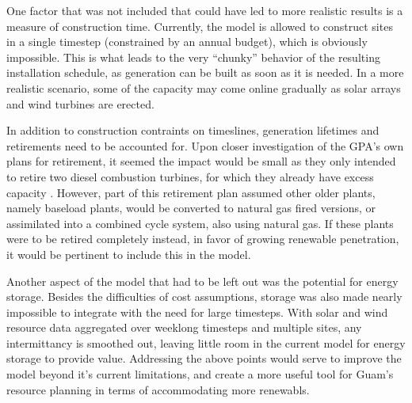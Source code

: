 \documentclass[12pt,letterpaper,fleqn]{article}
\begin{document}
One factor that was not included that could have led to more realistic
results is a measure of construction time. Currently, the model is
allowed to construct sites in a single timestep (constrained by an
annual budget), which is obviously impossible. This is what leads to
the very ``chunky'' behavior of the resulting installation schedule,
as generation can be built as soon as it is needed. In a more
realistic scenario, some of the capacity may come online gradually as
solar arrays and wind turbines are erected.

In addition to construction contraints on timeslines, generation
lifetimes and retirements need to be accounted for. 
Upon closer investigation of the GPA's own plans for
retirement, it seemed the impact would be small as they only intended
to retire two diesel combustion turbines, for which they already have
excess capacity \cite{cruz13}. However, part of this retirement plan
assumed other older plants, namely baseload plants, would be converted
to natural gas fired versions, or assimilated into a combined cycle
system, also using natural gas.  If these plants were to be retired
completely instead, in favor of growing renewable penetration, it
would be pertinent to include this in the model.

Another aspect of the model that had to be left out was the potential
for energy storage. Besides the difficulties of cost assumptions,
storage was also made nearly impossible to integrate with the need for
large timesteps. With solar and wind resource data aggregated over
weeklong timesteps and multiple sites, any intermittancy is smoothed
out, leaving little room in the current model for energy storage to
provide value. Addressing the above points would serve to improve the 
model beyond it's current limitations, and create a more useful tool for 
Guam's resource planning in terms of accommodating more renewabls.
\end{document}
